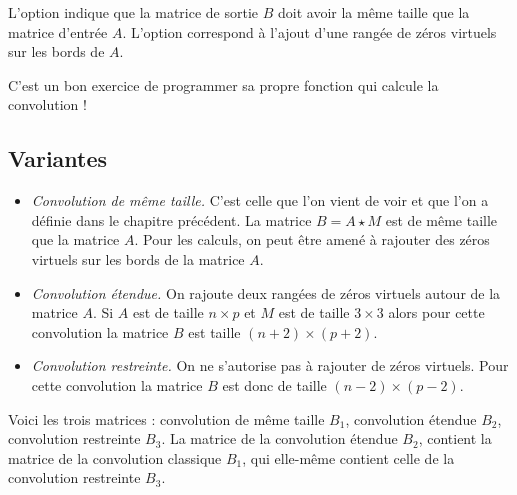 \documentclass[11pt,class=report,crop=false]{standalone}
\begin{document}
L'option  indique que la matrice de sortie $B$ doit avoir la même taille que la matrice d'entrée $A$.
L'option  correspond à l'ajout d'une rangée de zéros virtuels sur les bords de $A$.

C'est un bon exercice de programmer sa propre fonction qui calcule la convolution !

\subsection{Variantes}

\begin{itemize}
  \item \emph{Convolution de même taille.}
  C'est celle que l'on vient de voir et que l'on a définie dans le chapitre précédent. La matrice $B = A \star M$ est de même taille que la matrice $A$. Pour les calculs, on peut être amené à rajouter des zéros virtuels sur les bords de la matrice $A$.


  
  \item \emph{Convolution étendue.} On rajoute deux rangées de zéros virtuels autour de la matrice $A$. Si $A$ est de taille $n\times p$ et $M$ est de taille $3\times 3$ alors pour cette convolution la matrice $B$ est taille $(n+2) \times (p+2)$.
  


    
  \item\emph{Convolution restreinte.} On ne s'autorise pas à rajouter de zéros virtuels. Pour cette convolution la matrice $B$ est donc de taille $(n-2) \times (p-2)$. 
  
  

    
\end{itemize}

Voici les trois matrices : convolution de même taille $B_1$, convolution étendue $B_2$, convolution restreinte $B_3$. La matrice de la convolution étendue $B_2$, contient la matrice de la convolution classique $B_1$, qui elle-même contient celle de la convolution restreinte $B_3$. 
\end{document}
